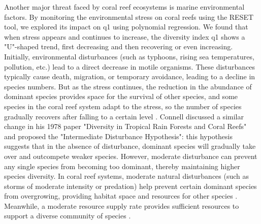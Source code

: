 \documentclass[a4paper, 11]{article}
\begin{document}
Another major threat faced by coral reef ecosystems is marine environmental factors. By monitoring the environmental stress on coral reefs using the RESET tool, we explored its impact on q1 using polynomial regression. We found that when stress appears and continues to increase, the diversity index q1 shows a "U"-shaped trend, first decreasing and then recovering or even increasing. Initially, environmental disturbances (such as typhoons, rising sea temperatures, pollution, etc.) lead to a direct decrease in motile organisms. These disturbances typically cause death, migration, or temporary avoidance, leading to a decline in species numbers. But as the stress continues, the reduction in the abundance of dominant species provides space for the survival of other species, and some species in the coral reef system adapt to the stress, so the number of species gradually recovers after falling to a certain level \citep{graham2006dynamic}. Connell discussed a similar change in his 1978 paper "Diversity in Tropical Rain Forests and Coral Reefs" and proposed the "Intermediate Disturbance Hypothesis": this hypothesis suggests that in the absence of disturbance, dominant species will gradually take over and outcompete weaker species. However, moderate disturbance can prevent any single species from becoming too dominant, thereby maintaining higher species diversity. In coral reef systems, moderate natural disturbances (such as storms of moderate intensity or predation) help prevent certain dominant species from overgrowing, providing habitat space and resources for other species \citep{connell1978diversity}. Meanwhile, a moderate resource supply rate provides sufficient resources to support a diverse community of species \citep{huston1979general}.
\end{document}
